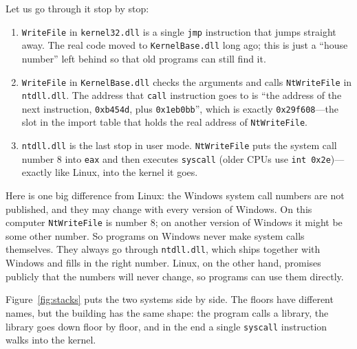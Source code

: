 Let us go through it stop by stop:
\begin{enumerate}
  \item \texttt{WriteFile} in \texttt{kernel32.dll} is a single \texttt{jmp} instruction that jumps straight away. The real code moved to \texttt{KernelBase.dll} long ago; this is just a ``house number'' left behind so that old programs can still find it.
  \item \texttt{WriteFile} in \texttt{KernelBase.dll} checks the arguments and calls \texttt{NtWriteFile} in \texttt{ntdll.dll}. The address that \texttt{call} instruction goes to is ``the address of the next instruction, \texttt{0xb454d}, plus \texttt{0x1eb0bb}'', which is exactly \texttt{0x29f608}---the slot in the import table that holds the real address of \texttt{NtWriteFile}.
  \item \texttt{ntdll.dll} is the last stop in user mode. \texttt{NtWriteFile} puts the system call number 8 into \texttt{eax} and then executes \texttt{syscall} (older CPUs use \texttt{int 0x2e})---exactly like Linux, into the kernel it goes.
\end{enumerate}

Here is one big difference from Linux: the Windows system call numbers are not published, and they may change with every version of Windows. On this computer \texttt{NtWriteFile} is number 8; on another version of Windows it might be some other number. So programs on Windows never make system calls themselves. They always go through \texttt{ntdll.dll}, which ships together with Windows and fills in the right number. Linux, on the other hand, promises publicly that the numbers will never change, so programs can use them directly.

Figure~\ref{fig:stacks} puts the two systems side by side. The floors have different names, but the building has the same shape: the program calls a library, the library goes down floor by floor, and in the end a single \texttt{syscall} instruction walks into the kernel.

